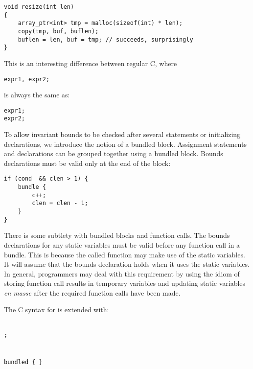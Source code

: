 \begin{verbatim}
void resize(int len) 
{
    array_ptr<int> tmp = malloc(sizeof(int) * len);
    copy(tmp, buf, buflen);
    buflen = len, buf = tmp; // succeeds, surprisingly
}
\end{verbatim}

This is an interesting difference between regular C, where

\begin{verbatim}
expr1, expr2;
\end{verbatim}

is always the same as:

\begin{verbatim}
expr1;
expr2;
\end{verbatim}

To allow invariant bounds to be checked after several statements or
initializing declarations, we introduce the notion of a bundled block.
Assignment statements and declarations can be grouped together using a
bundled block. Bounds declarations must be valid only at the end of the
block:

\begin{verbatim}
if (cond  && clen > 1) {
    bundle {
        c++;
        clen = clen - 1;
    }
}
\end{verbatim}

There is some subtlety with bundled blocks and function calls. The
bounds declarations for any static variables must be valid before any
function call in a bundle. This is because the called function may make
use of the static variables. It will assume that the bounds declaration
holds when it uses the static variables. In general, programmers may
deal with this requirement by using the idiom of storing function call
results in temporary variables and updating static variables \textit{en
masse} after the required function calls have been made.

The C syntax for is extended with:
\begin{tabbing}
\=\\
\>\texttt{;} \\
\\
 \\
\>\texttt{bundled \{  \}} \\
\\
\\
\>  \\
\>  \\
\\
\\
\> \\
\>  
\end{tabbing}

